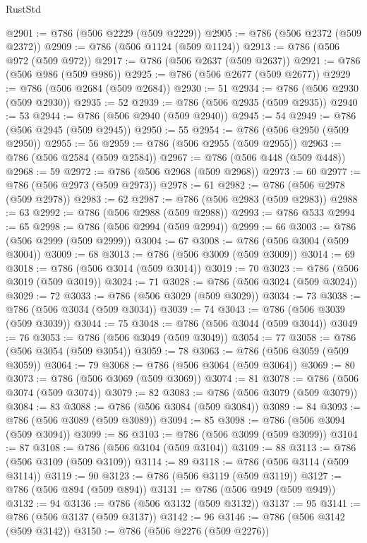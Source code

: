 \begin{lexlean}{RustStd}
\begin{coremodule}
@2901 := @786 (@506 @2229 (@509 @2229))
@2905 := @786 (@506 @2372 (@509 @2372))
@2909 := @786 (@506 @1124 (@509 @1124))
@2913 := @786 (@506 @972 (@509 @972))
@2917 := @786 (@506 @2637 (@509 @2637))
@2921 := @786 (@506 @986 (@509 @986))
@2925 := @786 (@506 @2677 (@509 @2677))
@2929 := @786 (@506 @2684 (@509 @2684))
@2930 := 51
@2934 := @786 (@506 @2930 (@509 @2930))
@2935 := 52
@2939 := @786 (@506 @2935 (@509 @2935))
@2940 := 53
@2944 := @786 (@506 @2940 (@509 @2940))
@2945 := 54
@2949 := @786 (@506 @2945 (@509 @2945))
@2950 := 55
@2954 := @786 (@506 @2950 (@509 @2950))
@2955 := 56
@2959 := @786 (@506 @2955 (@509 @2955))
@2963 := @786 (@506 @2584 (@509 @2584))
@2967 := @786 (@506 @448 (@509 @448))
@2968 := 59
@2972 := @786 (@506 @2968 (@509 @2968))
@2973 := 60
@2977 := @786 (@506 @2973 (@509 @2973))
@2978 := 61
@2982 := @786 (@506 @2978 (@509 @2978))
@2983 := 62
@2987 := @786 (@506 @2983 (@509 @2983))
@2988 := 63
@2992 := @786 (@506 @2988 (@509 @2988))
@2993 := @786 @533
@2994 := 65
@2998 := @786 (@506 @2994 (@509 @2994))
@2999 := 66
@3003 := @786 (@506 @2999 (@509 @2999))
@3004 := 67
@3008 := @786 (@506 @3004 (@509 @3004))
@3009 := 68
@3013 := @786 (@506 @3009 (@509 @3009))
@3014 := 69
@3018 := @786 (@506 @3014 (@509 @3014))
@3019 := 70
@3023 := @786 (@506 @3019 (@509 @3019))
@3024 := 71
@3028 := @786 (@506 @3024 (@509 @3024))
@3029 := 72
@3033 := @786 (@506 @3029 (@509 @3029))
@3034 := 73
@3038 := @786 (@506 @3034 (@509 @3034))
@3039 := 74
@3043 := @786 (@506 @3039 (@509 @3039))
@3044 := 75
@3048 := @786 (@506 @3044 (@509 @3044))
@3049 := 76
@3053 := @786 (@506 @3049 (@509 @3049))
@3054 := 77
@3058 := @786 (@506 @3054 (@509 @3054))
@3059 := 78
@3063 := @786 (@506 @3059 (@509 @3059))
@3064 := 79
@3068 := @786 (@506 @3064 (@509 @3064))
@3069 := 80
@3073 := @786 (@506 @3069 (@509 @3069))
@3074 := 81
@3078 := @786 (@506 @3074 (@509 @3074))
@3079 := 82
@3083 := @786 (@506 @3079 (@509 @3079))
@3084 := 83
@3088 := @786 (@506 @3084 (@509 @3084))
@3089 := 84
@3093 := @786 (@506 @3089 (@509 @3089))
@3094 := 85
@3098 := @786 (@506 @3094 (@509 @3094))
@3099 := 86
@3103 := @786 (@506 @3099 (@509 @3099))
@3104 := 87
@3108 := @786 (@506 @3104 (@509 @3104))
@3109 := 88
@3113 := @786 (@506 @3109 (@509 @3109))
@3114 := 89
@3118 := @786 (@506 @3114 (@509 @3114))
@3119 := 90
@3123 := @786 (@506 @3119 (@509 @3119))
@3127 := @786 (@506 @894 (@509 @894))
@3131 := @786 (@506 @949 (@509 @949))
@3132 := 94
@3136 := @786 (@506 @3132 (@509 @3132))
@3137 := 95
@3141 := @786 (@506 @3137 (@509 @3137))
@3142 := 96
@3146 := @786 (@506 @3142 (@509 @3142))
@3150 := @786 (@506 @2276 (@509 @2276))

\end{coremodule}
\end{lexlean}
